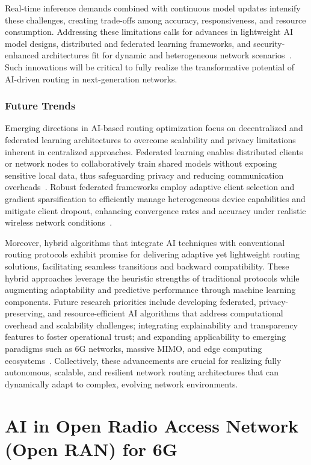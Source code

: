 \documentclass[sigconf]{acmart}
\begin{document}
Real-time inference demands combined with continuous model updates intensify these challenges, creating trade-offs among accuracy, responsiveness, and resource consumption. Addressing these limitations calls for advances in lightweight AI model designs, distributed and federated learning frameworks, and security-enhanced architectures fit for dynamic and heterogeneous network scenarios~\cite{ref4,ref53}. Such innovations will be critical to fully realize the transformative potential of AI-driven routing in next-generation networks.

\subsubsection{Future Trends}

Emerging directions in AI-based routing optimization focus on decentralized and federated learning architectures to overcome scalability and privacy limitations inherent in centralized approaches. Federated learning enables distributed clients or network nodes to collaboratively train shared models without exposing sensitive local data, thus safeguarding privacy and reducing communication overheads~\cite{ref53}. Robust federated frameworks employ adaptive client selection and gradient sparsification to efficiently manage heterogeneous device capabilities and mitigate client dropout, enhancing convergence rates and accuracy under realistic wireless network conditions~\cite{ref49}.

Moreover, hybrid algorithms that integrate AI techniques with conventional routing protocols exhibit promise for delivering adaptive yet lightweight routing solutions, facilitating seamless transitions and backward compatibility. These hybrid approaches leverage the heuristic strengths of traditional protocols while augmenting adaptability and predictive performance through machine learning components. Future research priorities include developing federated, privacy-preserving, and resource-efficient AI algorithms that address computational overhead and scalability challenges; integrating explainability and transparency features to foster operational trust; and expanding applicability to emerging paradigms such as 6G networks, massive MIMO, and edge computing ecosystems~\cite{ref53}. Collectively, these advancements are crucial for realizing fully autonomous, scalable, and resilient network routing architectures that can dynamically adapt to complex, evolving network environments.

\section{AI in Open Radio Access Network (Open RAN) for 6G}
\end{document}
